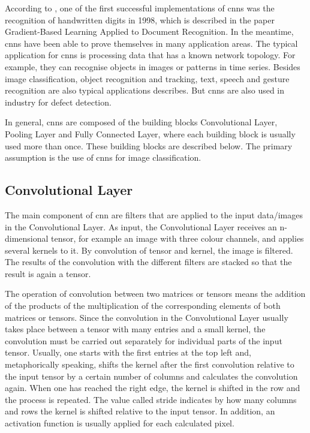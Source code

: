 According to \cite{Sharma:2018}, one of the first successful implementations of \ac{cnn}s was the recognition of handwritten digits in 1998, which is described in the paper \glqq Gradient-Based Learning Applied to Document Recognition\grqq \cite{LeCun:1998}. In the meantime, \ac{cnn}s have been able to prove themselves in many application areas. The typical application for \ac{cnn}s is processing data that has a known network topology. For example, they can recognise objects in images or patterns in time series. \cite{Namatevs:2017} Besides image classification, object recognition and tracking, text, speech and gesture recognition are also typical applications \cite{Gu:2018} describes. But \ac{cnn}s are also used in industry for defect detection. \cite{LopezdeLacalle:2020}

In general, \ac{cnn}s are composed of the building blocks Convolutional Layer, Pooling Layer and Fully Connected Layer, where each building block is usually used more than once. These building blocks are described below. The primary assumption is the use of \ac{cnn}s for image classification.

\subsection{Convolutional Layer}

The main component of \ac{cnn} are filters that are applied to the input data/images in the Convolutional Layer. As input, the Convolutional Layer receives an n-dimensional tensor, for example an image with three colour channels, and applies several kernels to it. By convolution of tensor and kernel, the image is filtered. The results of the convolution with the different filters are stacked so that the result is again a tensor. \cite{Michelucci:2019}

The operation of convolution between two matrices or tensors means the addition of the products of the multiplication of the corresponding elements of both matrices or tensors. Since the convolution in the Convolutional Layer usually takes place between a tensor with many entries and a small kernel, the convolution must be carried out separately for individual parts of the input tensor. Usually, one starts with the first entries at the top left and, metaphorically speaking, shifts the kernel after the first convolution relative to the input tensor by a certain number of columns and calculates the convolution again. When one has reached the right edge, the kernel is shifted in the row and the process is repeated. The value called stride indicates by how many columns and rows the kernel is shifted relative to the input tensor. In addition, an activation function is usually applied for each calculated pixel. \cite{Michelucci:2019}

